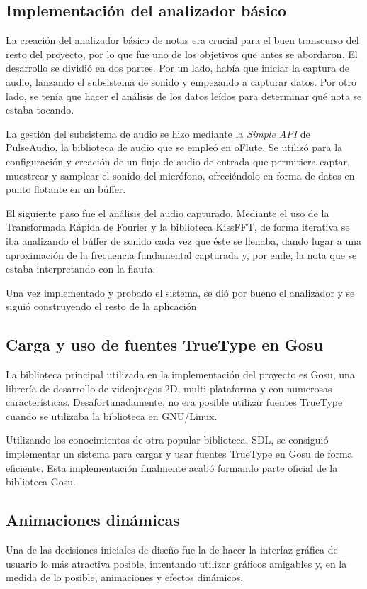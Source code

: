 \documentclass[a4paper,11pt]{article}
\begin{document}
\subsection{Implementación del analizador básico}
La creación del analizador básico de notas era crucial para el buen transcurso
del resto del proyecto, por lo que fue uno de los objetivos que antes se
abordaron. El desarrollo se dividió en dos partes. Por un lado, había que
iniciar la captura de audio, lanzando el subsistema de sonido y empezando a
capturar datos. Por otro lado, se tenía que hacer el análisis de los datos
leídos para determinar qué nota se estaba tocando.

La gestión del subsistema de audio se hizo mediante la \textit{Simple API} de
PulseAudio, la biblioteca de audio que se empleó en oFlute. Se utilizó para la
configuración y creación de un flujo de audio de entrada que permitiera captar,
muestrear y samplear el sonido del micrófono, ofreciéndolo en forma de datos en
punto flotante en un búffer.

El siguiente paso fue el análisis del audio capturado. Mediante el uso de la
Transformada Rápida de Fourier y la biblioteca KissFFT, de forma iterativa se
iba analizando el búffer de sonido cada vez que éste se llenaba, dando lugar a
una aproximación de la frecuencia fundamental capturada y, por ende, la nota que
se estaba interpretando con la flauta.

Una vez implementado y probado el sistema, se dió por bueno el analizador y se
siguió construyendo el resto de la aplicación

\subsection{Carga y uso de fuentes TrueType en Gosu}
La biblioteca principal utilizada en la implementación del proyecto es Gosu, una
librería de desarrollo de videojuegos 2D, multi-plataforma y con numerosas
características. Desafortunadamente, no era posible utilizar fuentes TrueType
cuando se utilizaba la biblioteca en GNU/Linux.

Utilizando los conocimientos de otra popular biblioteca, SDL, se consiguió
implementar un sistema para cargar y usar fuentes TrueType en Gosu de forma
eficiente. Esta implementación finalmente acabó formando parte oficial de la
biblioteca Gosu.

\subsection{Animaciones dinámicas}
Una de las decisiones iniciales de diseño fue la de hacer la interfaz gráfica de
usuario lo más atractiva posible, intentando utilizar gráficos amigables y, en
la medida de lo posible, animaciones y efectos dinámicos.
\end{document}

